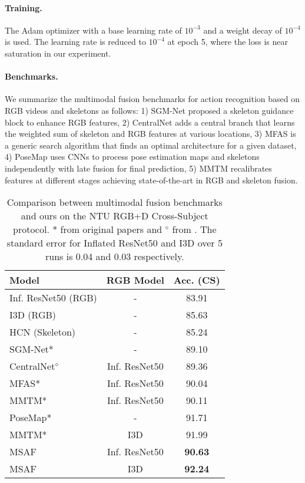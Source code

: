 \documentclass[10pt,twocolumn,letterpaper]{article}
\begin{document}
\paragraph{Training.}
The Adam optimizer with a base learning rate of $10^{-3}$ and a weight decay of $10^{-4}$ is used. The learning rate is reduced to $10^{-4}$ at epoch 5, where the loss is near saturation in our experiment. 

\paragraph{Benchmarks.}
We summarize the multimodal fusion benchmarks for action recognition based on RGB videos and skeletons as follows: 1) SGM-Net \cite{li2020sgm} proposed a skeleton guidance block to enhance RGB features, 2) CentralNet \cite{vielzeuf2018centralnet} adds a central branch that learns the weighted sum of skeleton and RGB features at various locations, 3) MFAS \cite{Perez-Rua_2019_CVPR} is a generic search algorithm that finds an optimal architecture for a given dataset, 4) PoseMap \cite{liu2018recognizing} uses CNNs to process pose estimation maps and skeletons independently with late fusion for final prediction, 5) MMTM \cite{joze2020mmtm} recalibrates features at different stages achieving state-of-the-art in RGB and skeleton fusion.

\begin{table}[t]
  \centering
  \small
    \begin{tabular}{lcc} Model & RGB Model & Acc. (CS)\\
      \hline
      Inf. ResNet50 (RGB) & - & 83.91 \\
      I3D (RGB) & - & 85.63 \\
      HCN (Skeleton)& - & 85.24 \\
      \hline
      SGM-Net* & - & 89.10 \\
      CentralNet$^\diamond$ & Inf. ResNet50 & 89.36 \\
      MFAS* & Inf. ResNet50 & 90.04 \\
      MMTM* & Inf. ResNet50 & 90.11 \\
      PoseMap* & - & 91.71 \\
      MMTM* & I3D & 91.99 \\
      \hline
      \multirow{1}{*}{MSAF} & \multirow{1}{*}{Inf. ResNet50} & \textbf{90.63}\\
      \multirow{1}{*}{MSAF} & \multirow{1}{*}{I3D} & \textbf{92.24}\\
      \hline
    \end{tabular}
    \caption{Comparison between multimodal fusion benchmarks and ours on the NTU RGB+D Cross-Subject protocol. * from original papers and $^\diamond$ from \cite{joze2020mmtm}. The standard error for Inflated ResNet50 and I3D over 5 runs is 0.04 and 0.03 respectively.}
    \label{table3}
\end{table}
\end{document}
